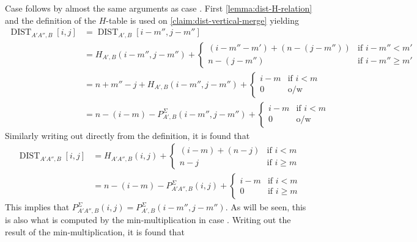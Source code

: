 \documentclass[twoside,11pt,openright]{report}
\newcommand{\DIST}{\operatorname{DIST}}
\newcommand*{\circled}[1]{\tikz[baseline=(char.base)]{
                          \node[shape=circle,draw,inner sep=2pt] (char) {#1};}}
\begin{document}
Case \circled{2} follows by almost the same arguments as case \circled{1}. First \cref{lemma:dist-H-relation} and the definition of the $H$-table is used on \cref{claim:dist-vertical-merge} yielding
\begin{align*}
  \DIST_{A'A'',B}[i, j] &= \DIST_{A',B}[i - m'', j - m''] \\
    &= H_{A',B}(i - m'', j - m'') +
      \begin{cases}
        (i - m'' - m') + (n - (j - m'')) & \text{if } i - m'' < m' \\
        n - (j - m'')                    & \text{if } i - m'' \geq m'
      \end{cases} \\
    &= n + m'' - j + H_{A',B}(i - m'', j - m'') +
      \begin{cases}
        i - m   & \text{if } i < m \\
        0       & \text{o/w}
      \end{cases} \\
    &= n - (i - m) - P_{A',B}^{\Sigma}(i - m'', j - m'') +
      \begin{cases}
        i - m   & \text{if } i < m \\
        0       & \text{o/w}
      \end{cases}
\end{align*}
Similarly writing out directly from the definition, it is found that
\begin{align*}
  \DIST_{A'A'',B}[i, j] &= H_{A'A'',B}(i, j) +
    \begin{cases}
      (i - m) + (n - j) & \text{if } i < m \\
      n - j             & \text{if } i \geq m
    \end{cases} \\
  &= n - (i - m) - P_{A'A'',B}^{\Sigma}(i, j) +
    \begin{cases}
      i - m & \text{if } i < m \\
      0     & \text{if } i \geq m
    \end{cases}
\end{align*}
This implies that $P_{A'A'',B}^{\Sigma}(i, j) = P_{A',B}^{\Sigma}(i - m'', j - m'')$. As will be seen, this is also what is computed by the min-multiplication in case \circled{3}. Writing out the result of the min-multiplication, it is found that
\end{document}
